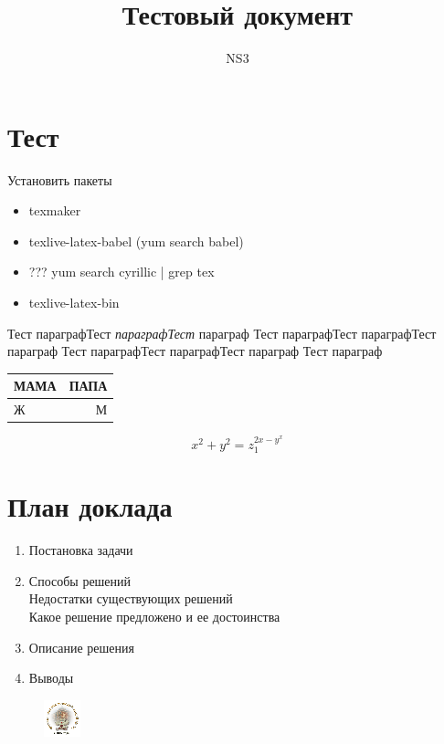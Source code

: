 \documentclass[a4paper]{article}
\author{NS3}
\title{Тестовый документ}
\begin{document}
\maketitle

\section{Тест}

\begin{Large}
Установить пакеты
\begin{itemize}
\item texmaker 
\item texlive-latex-babel   (yum search babel)
\item ???   yum search cyrillic | grep tex
\item texlive-latex-bin
\end{itemize}
\end{Large}
Тест параграфТест \textit{параграфТест} параграф Тест параграфТест параграфТест параграф Тест параграфТест параграфТест параграф Тест параграф

\begin{tabular}{|l|r|}
\hline
МАМА & ПАПА  \\
\hline 
Ж & М \\
\hline
\end{tabular}

$$x^2 + y^2 = z_1^{2x-y^x}$$

\section{План доклада}
\begin{enumerate}
\item Постановка задачи
\item Способы решений \\
Недостатки существующих решений \\
Какое решение предложено и ее достоинства
\item Описание решения 
\item Выводы
\end{enumerate}

\begin{figure}
\includegraphics{PhML30.eps}
\end{figure}
\end{document}
